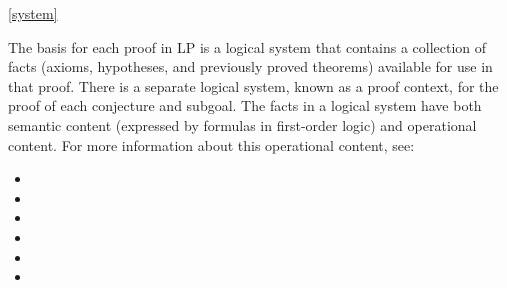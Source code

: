 \ref{system}

The basis for each proof in LP is a logical system that contains a collection
of facts (axioms, hypotheses, and previously proved theorems) available for use
in that proof.  There is a separate logical system, known as a proof context,
for the proof of each conjecture and subgoal.
\p
The facts in a logical system have both semantic content (expressed by formulas
in first-order logic) and operational content.  For more information about this
operational content, see:
\begin{itemize}
\item {}
\item {}
\item {}
\item {}
\item {}
\item {}
\end{itemize}

